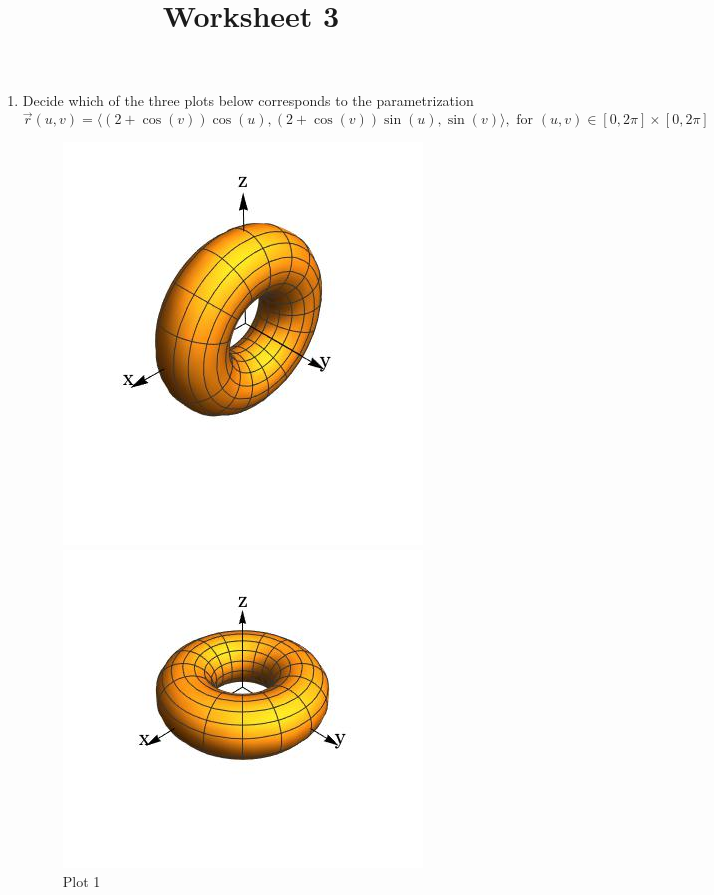 \documentclass[12pt]{article}
\title{Worksheet 3}
\newcommand{\vr}{\vec{r}{}}
\renewcommand{\lg}{\langle}
\newcommand{\rg}{\rangle}
\begin{document}
\maketitle
\begin{enumerate}
\item Decide which of the three plots below corresponds to the parametrization $$\vr(u,v)=\lg \left (2+\cos(v)\right )\cos(u),\left  (2+\cos(v)\right  )\sin(u),\sin(v)\rg, \text{ for }(u,v)\in[0,2\pi]\times [0,2\pi]$$
\begin{figure}[h]
  \includegraphics[width=\linewidth]{torus2.jpeg}
  \caption{Plot 1}
\endminipage\hfill
{}
  \includegraphics[width=\linewidth]{torus1.jpeg}

\end{figure}
\end{enumerate}
\end{document}
